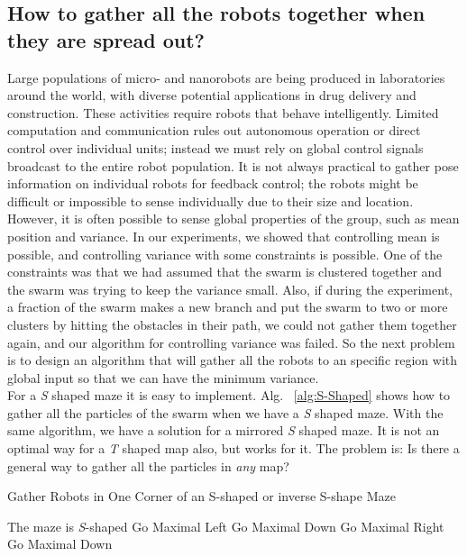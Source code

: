\subsection{How to gather all the robots together when they are spread out?}
Large populations of micro- and nanorobots are being produced in laboratories around the world, with diverse potential applications in drug delivery and construction. These activities require robots that behave intelligently. Limited computation and communication rules out autonomous operation or direct control over individual units; instead we must rely on global control signals broadcast to the entire robot population. It is not always practical to gather pose information on individual robots for feedback control; the robots might be difficult or impossible to sense individually due to their size and location. 
However, it is often possible to sense global properties of the group, such as mean position and variance. In our experiments, we showed that controlling mean is possible, and controlling variance with some constraints is possible. One of the constraints was that we had assumed that the swarm is clustered together and the swarm was trying to keep the variance small. Also, if during the experiment, a fraction of the swarm makes a new branch and put the swarm to two or more clusters by hitting the obstacles in their path, we could not gather them together again, and our algorithm for controlling variance was failed. So the next problem is to design an algorithm that will gather all the robots to an specific region with global input so that we can have the minimum variance. \\

For a \emph{S} shaped maze it is easy to implement. Alg. ~\ref{alg:S-Shaped} shows how to gather all the particles of the swarm when we have a \emph{S} shaped maze. With the same algorithm, we have a  solution for a mirrored \emph{S} shaped maze. It is not an optimal way for a \emph{T} shaped map also, but works for it. The problem is: Is there a general way to gather all the particles in \emph{any} map?

\begin{algorithm}
\caption{Gather Robots in One Corner of an S-shaped or inverse S-shape Maze}\label{alg:S-Shaped}
\begin{algorithmic}[1]

\Ensure   The maze is \emph{S}-shaped
\State Go Maximal Left
\State Go Maximal Down
\State Go Maximal Right
\State Go Maximal Down
\EndWhile


\end{algorithmic}
\end{algorithm}



